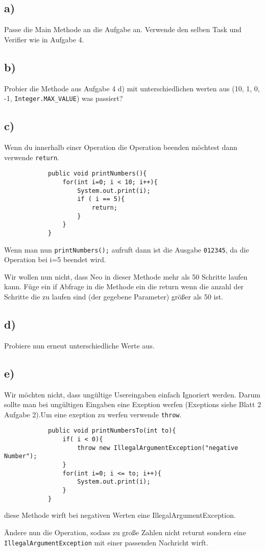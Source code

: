 \subsection*{a)}
	Passe die Main Methode an die Aufgabe an. Verwende den selben Task und Verifier wie in Aufgabe 4.
\subsection*{b)}
	Probier die Methode aus Aufgabe 4 d) mit unterschiedlichen werten aus (10, 1, 0, -1, \lstinline{Integer.MAX_VALUE}) was passiert?
\subsection*{c)}
	\begin{Infobox}[Return]
		Wenn du innerhalb einer Operation die Operation beenden möchtest dann verwende \lstinline{return}.
		\begin{lstlisting}
			public void printNumbers(){
				for(int i=0; i < 10; i++){
					System.out.print(i);
					if ( i == 5){
						return;
					}
				}
			}
		\end{lstlisting}
		Wenn man nun \lstinline{printNumbers();} aufruft dann ist die Ausgabe  \lstinline{012345}, da die Operation bei i=5 beendet wird.
	\end{Infobox}
	Wir wollen nun nicht, dass Neo in dieser Methode mehr als 50 Schritte laufen kann. Füge ein if Abfrage in die Methode ein die return wenn die anzahl der Schritte die zu laufen sind (der gegebene Parameter) größer als 50 ist.
\subsection*{d)}
	Probiere nun erneut unterschiedliche Werte aus.
\subsection*{e)}
	\begin{Infobox}
	Wir möchten nicht, dass ungültige Usereingaben einfach Ignoriert werden. Darum sollte man bei ungültigen Eingaben eine Exeption werfen (Exeptions siehe Blatt 2 Aufgabe 2).Um eine exeption zu werfen verwende \lstinline{throw}.
	 	\begin{lstlisting}
			public void printNumbersTo(int to){
				if( i < 0){
					throw new IllegalArgumentException("negative Number");	
				}
				for(int i=0; i <= to; i++){
					System.out.print(i);
				}
			}
		\end{lstlisting}
	diese Methode wirft bei negativen Werten eine IllegalArgumentException.
	\end{Infobox}
	Ändere nun die Operation, sodass zu große Zahlen nicht returnt sondern eine \lstinline{IllegalArgumentException} mit einer passenden Nachricht wirft.

